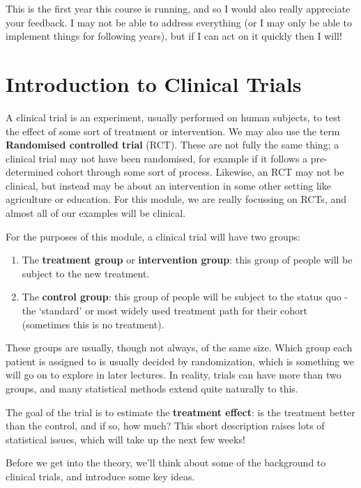 \documentclass[
  openany]{book}
\providecommand{\tightlist}{%
  \setlength{\itemsep}{0pt}\setlength{\parskip}{0pt}}
\theoremstyle{definition}
\theoremstyle{definition}
\theoremstyle{definition}
\theoremstyle{definition}
\theoremstyle{remark}
\begin{document}
This is the first year this course is running, and so I would also really appreciate your feedback. I may not be able to address everything (or I may only be able to implement things for following years), but if I can act on it quickly then I will!

\hypertarget{rct-intro}{%
\chapter{Introduction to Clinical Trials}\label{rct-intro}}

A clinical trial is an experiment, usually performed on human subjects, to test the effect of some sort of treatment or intervention. We may also use the term \textbf{Randomised controlled trial} (RCT). These are not fully the same thing; a clinical trial may not have been randomised, for example if it follows a pre-determined cohort through some sort of process. Likewise, an RCT may not be clinical, but instead may be about an intervention in some other setting like agriculture or education. For this module, we are really focussing on RCTs, and almost all of our examples will be clinical.

For the purposes of this module, a clinical trial will have two groups:

\begin{enumerate}
\def\labelenumi{\arabic{enumi}.}
\tightlist
\item
  The \textbf{treatment group} or \textbf{intervention group}: this group of people will be subject to the new treatment.
\item
  The \textbf{control group}: this group of people will be subject to the status quo - the `standard' or most widely used treatment path for their cohort (sometimes this is no treatment).
\end{enumerate}

These groups are usually, though not always, of the same size. Which group each patient is assigned to is usually decided by randomization, which is something we will go on to explore in later lectures. In reality, trials can have more than two groups, and many statistical methods extend quite naturally to this.

The goal of the trial is to estimate the \textbf{treatment effect}: is the treatment better than the control, and if so, how much? This short description raises lots of statistical issues, which will take up the next few weeks!

Before we get into the theory, we'll think about some of the background to clinical trials, and introduce some key ideas.
\end{document}
